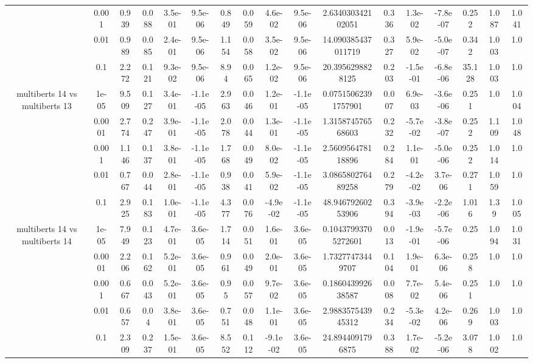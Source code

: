 \begin{tabular}{|c|c|c|c|c|c|c|c|c|c|c|c|c|c|c|c|c|}
 & 0.001 & 0.939 & 0.088 & 3.5e-01 & 9.5e-06 & 0.849 & 0.059 & 4.6e-02 & 9.5e-06 & 2.634030342102051 & 0.336 & 1.3e-02 & -7.8e-07 & 0.252 & 1.087 & 1.041 \\
 & 0.01 & 0.989 & 0.085 & 2.4e-01 & 9.5e-06 & 1.154 & 0.058 & 3.5e-02 & 9.5e-06 & 14.090385437011719 & 0.327 & 5.9e-02 & -5.0e-07 & 0.342 & 1.003 & 1.0 \\
 & 0.1 & 2.272 & 0.121 & 9.3e-02 & 9.5e-06 & 8.94 & 0.065 & 1.2e-02 & 9.5e-06 & 20.3956298828125 & 0.203 & -1.5e-01 & -6.8e-06 & 35.128 & 1.003 & 1.0 \\
\hline
\multirow{5}{*}{multiberts 14 vs multiberts 13} & 1e-05 & 9.509 & 0.127 & 3.4e-01 & -1.1e-05 & 2.963 & 0.046 & 1.2e-01 & -1.1e-05 & 0.07515062391757901 & 0.007 & 6.9e-03 & -3.6e-06 & 0.251 & 1.0 & 1.004 \\
 & 0.0001 & 2.774 & 0.247 & 3.9e-01 & -1.1e-05 & 2.078 & 0.044 & 1.3e-01 & -1.1e-05 & 1.315874576568603 & 0.232 & -5.7e-02 & -3.8e-07 & 0.252 & 1.109 & 1.048 \\
 & 0.001 & 1.146 & 0.137 & 3.8e-01 & -1.1e-05 & 1.768 & 0.049 & 8.0e-02 & -1.1e-05 & 2.560956478118896 & 0.284 & 1.1e-01 & -5.0e-06 & 0.252 & 1.014 & 1.0 \\
 & 0.01 & 0.767 & 0.044 & 2.8e-01 & -1.1e-05 & 0.938 & 0.041 & 5.9e-02 & -1.1e-05 & 3.086580276489258 & 0.279 & -4.2e-02 & 3.7e-06 & 0.271 & 1.059 & 1.0 \\
 & 0.1 & 2.925 & 0.183 & 1.0e-01 & -1.1e-05 & 4.377 & 0.076 & -4.9e-02 & -1.1e-05 & 48.94679260253906 & 0.394 & -3.9e-03 & -2.2e-06 & 1.016 & 1.39 & 1.005 \\
\hline
\multirow{5}{*}{multiberts 14 vs multiberts 14} & 1e-05 & 7.949 & 0.123 & 4.7e-01 & 3.6e-05 & 1.714 & 0.051 & 1.6e-01 & 3.6e-05 & 0.10437993705272601 & 0.013 & -1.9e-01 & -5.7e-06 & 0.25 & 1.094 & 1.031 \\
 & 0.0001 & 2.206 & 0.162 & 5.2e-01 & 3.6e-05 & 0.961 & 0.049 & 2.0e-01 & 3.6e-05 & 1.73277473449707 & 0.104 & 1.9e-01 & 6.3e-06 & 0.258 & 1.0 & 1.0 \\
 & 0.001 & 0.667 & 0.043 & 5.2e-01 & 3.6e-05 & 0.95 & 0.057 & 9.7e-02 & 3.6e-05 & 0.186043992638587 & 0.008 & 7.7e-02 & 5.4e-06 & 0.251 & 1.0 & 1.0 \\
 & 0.01 & 0.657 & 0.04 & 3.8e-01 & 3.6e-05 & 0.751 & 0.048 & 1.1e-01 & 3.6e-05 & 2.988357543945312 & 0.234 & -5.3e-02 & 4.2e-06 & 0.269 & 1.003 & 1.0 \\
 & 0.1 & 2.309 & 0.237 & 1.5e-01 & 3.6e-05 & 8.552 & 0.112 & -9.1e-02 & 3.6e-05 & 24.8944091796875 & 0.388 & 1.7e-02 & -5.2e-06 & 3.078 & 1.002 & 1.0 \\

\end{tabular}
